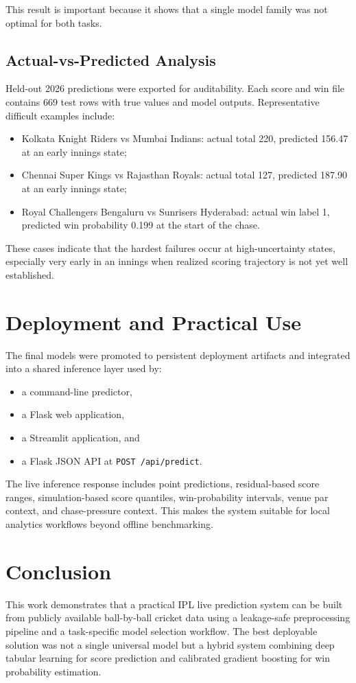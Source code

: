 \documentclass[conference]{IEEEtran}
\begin{document}
This result is important because it shows that a single model family was not optimal for both tasks.

\subsection{Actual-vs-Predicted Analysis}
Held-out 2026 predictions were exported for auditability. Each score and win file contains 669 test rows with true values and model outputs. Representative difficult examples include:
\begin{itemize}
\item Kolkata Knight Riders vs Mumbai Indians: actual total 220, predicted 156.47 at an early innings state;
\item Chennai Super Kings vs Rajasthan Royals: actual total 127, predicted 187.90 at an early innings state;
\item Royal Challengers Bengaluru vs Sunrisers Hyderabad: actual win label 1, predicted win probability 0.199 at the start of the chase.
\end{itemize}

These cases indicate that the hardest failures occur at high-uncertainty states, especially very early in an innings when realized scoring trajectory is not yet well established.

\section{Deployment and Practical Use}
The final models were promoted to persistent deployment artifacts and integrated into a shared inference layer used by:
\begin{itemize}
\item a command-line predictor,
\item a Flask web application,
\item a Streamlit application, and
\item a Flask JSON API at \texttt{POST /api/predict}.
\end{itemize}

The live inference response includes point predictions, residual-based score ranges, simulation-based score quantiles, win-probability intervals, venue par context, and chase-pressure context. This makes the system suitable for local analytics workflows beyond offline benchmarking.

\section{Conclusion}
This work demonstrates that a practical IPL live prediction system can be built from publicly available ball-by-ball cricket data using a leakage-safe preprocessing pipeline and a task-specific model selection workflow. The best deployable solution was not a single universal model but a hybrid system combining deep tabular learning for score prediction and calibrated gradient boosting for win probability estimation.
\end{document}
